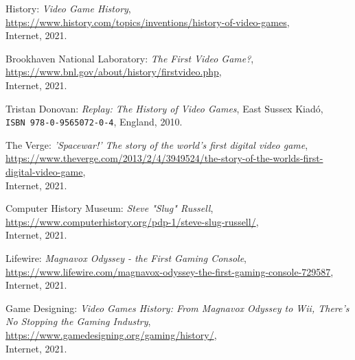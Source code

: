 
\begin{thebibliography}{x}

	History: \emph{Video Game History}, \\
	\url{https://www.history.com/topics/inventions/history-of-video-games}, \\
	Internet, 2021.
	
	Brookhaven National Laboratory: \emph{The First Video Game?}, \\
	\url{https://www.bnl.gov/about/history/firstvideo.php}, \\
	Internet, 2021.
	
	Tristan Donovan: \emph{Replay: The History of Video Games},
	East Sussex Kiadó, \\
	\texttt{ISBN 978-0-9565072-0-4}, England, 2010.
	
	The Verge: \emph{'Spacewar!' The story of the world's first digital video game}, \\
	\url{https://www.theverge.com/2013/2/4/3949524/the-story-of-the-worlds-first-digital-video-game}, \\
	Internet, 2021.
	
	Computer History Museum: \emph{Steve "Slug" Russell}, \\
	\url{https://www.computerhistory.org/pdp-1/steve-slug-russell/}, \\
	Internet, 2021.
	
	Lifewire: \emph{Magnavox Odyssey - the First Gaming Console}, \\
	\url{https://www.lifewire.com/magnavox-odyssey-the-first-gaming-console-729587}, \\
	Internet, 2021.
	
	Game Designing: \emph{Video Games History: From Magnavox Odyssey to Wii, There’s No Stopping the Gaming Industry}, \\
	\url{https://www.gamedesigning.org/gaming/history/}, \\
	Internet, 2021.
	

\end{thebibliography}
